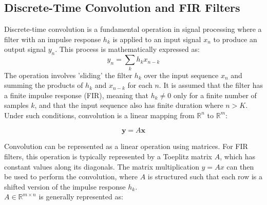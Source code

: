 \subsection{Discrete-Time Convolution and FIR Filters}
Discrete-time convolution is a fundamental operation in signal processing where a filter with an impulse response \( h_k \) is applied to an input signal \( x_n \) to produce an output signal \( y_n \). This process is mathematically expressed as:
\begin{equation*}
    y_n = \sum_k h_k x_{n-k}
\end{equation*}
The operation involves 'sliding' the filter \( h_k \) over the input sequence \( x_n \) and summing the products of \( h_k \) and \( x_{n-k} \) for each \( n \). It is assumed that the filter has a finite impulse response (FIR), meaning that \( h_k \neq 0 \) only for a finite number of samples \( k \), and that the input sequence also has finite duration where \( n > K \). \\

Under such conditions, convolution is a linear mapping from $\mathbb{R}^n$ to $\mathbb{R}^m$:

\[\mathbf{y} = A\mathbf{x}\]


Convolution can be represented as a linear operation using matrices. For FIR filters, this operation is typically represented by a Toeplitz matrix \( A \), which has constant values along its diagonals. The matrix multiplication \( y = Ax \) can then be used to perform the convolution, where \( A \) is structured such that each row is a shifted version of the impulse response \( h_k \). \\

$A \in \mathbb{R}^{m\times n}$ is generally represented as:

